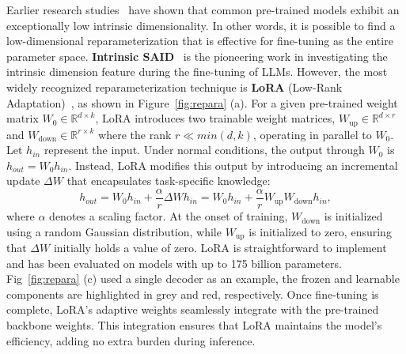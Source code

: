 Earlier research studies~\cite{intrinsic-SAID} have shown that common pre-trained models exhibit an exceptionally low intrinsic dimensionality. In other words, it is possible to find a low-dimensional reparameterization that is effective for fine-tuning as the entire parameter space.
\textbf{Intrinsic SAID}~\cite{intrinsic-SAID} is the pioneering work in investigating the intrinsic dimension feature during the fine-tuning of LLMs. However, the most widely recognized reparameterization technique is \textbf{LoRA} (Low-Rank Adaptation)~\cite{5-LoRA,fomenko2024note}, as shown in Figure~\ref{fig:repara} (a).
For a given pre-trained weight matrix $W_0 \in \mathbb{R}^{d \times k}$, LoRA introduces two trainable weight matrices, \(W_{\text{up}} \in \mathbb{R}^{d \times r}\) and \(W_{\text{down}} \in \mathbb{R}^{r \times k}\) where the rank $r \ll min (d,k)$, operating in parallel to $W_0$. Let $h_{in}$ represent the input. Under normal conditions, the output through \( W_0 \) is \( h_{out} = W_0h_{in} \). Instead, LoRA modifies this output by introducing an incremental update $\Delta W$ that encapsulates task-specific knowledge:
\begin{equation}
    h_{out} = W_0h_{in} + \frac{\alpha}{r}\Delta Wh_{in} = W_0h_{in} +\frac{\alpha}{r} W_{\text{up}}W_{\text{down}}h_{in},
\end{equation}
where $\alpha$ denotes a scaling factor. At the onset of training, \( W_{\text{down}} \) is initialized using a random Gaussian distribution, while \( W_{\text{up}} \) is initialized to zero, ensuring that \( \Delta W \) initially holds a value of zero.
LoRA is straightforward to implement and has been evaluated on models with up to 175 billion parameters. Fig~\ref{fig:repara} (c) used a single decoder as an example, the frozen and learnable components are highlighted in grey and red, respectively. Once fine-tuning is complete, LoRA's adaptive weights seamlessly integrate with the pre-trained backbone weights. This integration ensures that LoRA maintains the model's efficiency, adding no extra burden during inference.

